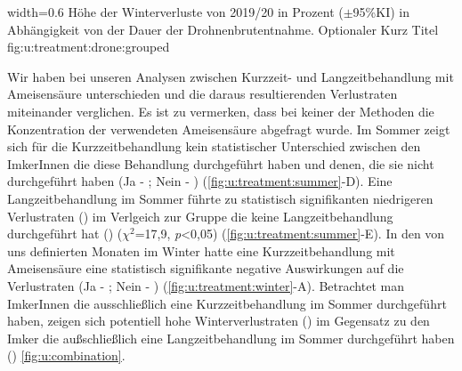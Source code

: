 {width=0.6\textwidth} %
{Höhe der Winterverluste von 2019/20 in Prozent ($\pm$95\%KI) in Abhängigkeit von der Dauer der Drohnenbrutentnahme.} %
{Optionaler Kurz Titel} %
{fig:u:treatment:drone:grouped} %



Wir haben bei unseren Analysen zwischen Kurzzeit- und Langzeitbehandlung mit Ameisensäure unterschieden und die daraus resultierenden Verlustraten miteinander verglichen. Es ist zu vermerken, dass bei keiner der Methoden die Konzentration der verwendeten Ameisensäure abgefragt wurde.
\newline
Im Sommer zeigt sich für die Kurzzeitbehandlung kein statistischer Unterschied zwischen den ImkerInnen die diese Behandlung durchgeführt haben und denen, die sie nicht durchgeführt haben (Ja - ; Nein - ) (\cref{fig:u:treatment:summer}-D). Eine Langzeitbehandlung im Sommer führte zu statistisch signifikanten niedrigeren Verlustraten () im Verlgeich zur Gruppe die keine Langzeitbehandlung durchgeführt hat () ($\chi^{2}$=17,9, \textit{p}<0,05) (\cref{fig:u:treatment:summer}-E). In den von uns definierten Monaten im Winter hatte eine Kurzzeitbehandlung mit Ameisensäure eine statistisch signifikante negative Auswirkungen auf die Verlustraten (Ja - ; Nein - ) (\cref{fig:u:treatment:winter}-A).
\newline
Betrachtet man ImkerInnen die ausschließlich eine Kurzzeitbehandlung im Sommer durchgeführt haben, zeigen sich potentiell hohe Winterverlustraten () im Gegensatz zu den Imker die außschließlich eine Langzeitbehandlung im Sommer durchgeführt haben () \cref{fig:u:combination}.


